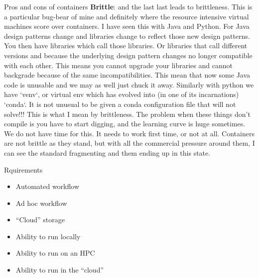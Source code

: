 \documentclass[usenames,dvipsnames,10pt]{beamer}
\begin{document}
\begin{frame}{Pros and cons of containers}
{    \textbf{Brittle}: and the last last leads to brittleness. This is a particular bug-bear of mine and definitely where the resource intensive virtual machines score over containers. I have seen this with Java and Python. For Java design patterns change and libraries change to reflect those new design patterns. You then have libraries which call those libraries. Or libraries that call different versions and because the underlying design pattern changes no longer compatible with each other. This means you cannot upgrade your libraries and cannot backgrade because of the same incompatibilities. This mean that now some Java code is unusable and we may as well just chuck it away. Similarly with python we have `venv`, or virtual env which has evolved into (in one of its incarnations) `conda`. It is not unusual to be given a conda configuration file that will not solve!!! This is what I mean by brittleness. The problem when these things don’t compile is you have to start digging, and the learning curve is huge sometimes. We do not have time for this. It needs to work first time, or not at all. Containers are not brittle as they stand, but with all the commercial pressure around them, I can see the standard fragmenting and them ending up in this state.
    }
\end{frame}

\begin{frame}{Rquirements}

    \begin{itemize}
        \item Automated workflow
        \item Ad hoc workflow
        \item “Cloud” storage
        \item Ability to run locally
        \item Ability to run on an HPC
        \item Ability to run in the “cloud”
    \end{itemize}

\end{frame}
\end{document}
